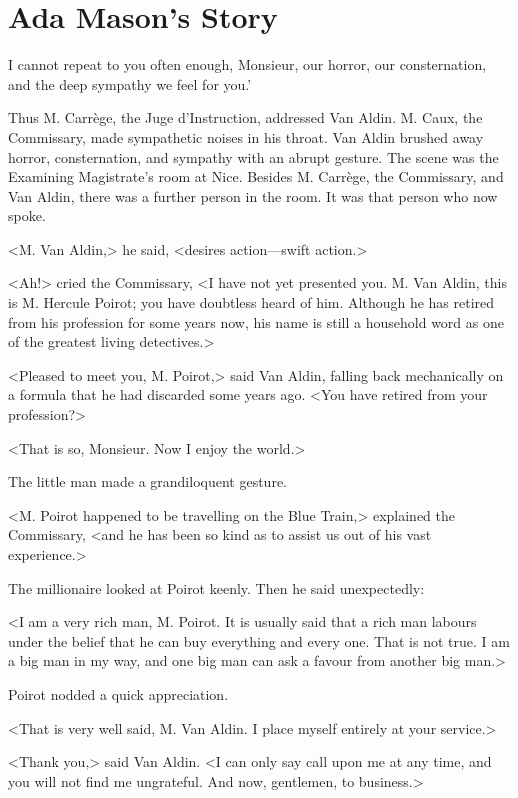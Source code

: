 \chapter{Ada Mason's Story}


\lettrine[ante=`]{I}{} cannot repeat to you often enough, Monsieur, our horror, our consternation, and the deep sympathy we feel for you.'

\zz
Thus M. Carrège, the Juge d'Instruction, addressed Van Aldin. M. Caux, the Commissary, made sympathetic noises in his throat. Van Aldin brushed away horror, consternation, and sympathy with an abrupt gesture. The scene was the Examining Magistrate's room at Nice. Besides M. Carrège, the Commissary, and Van Aldin, there was a further person in the room. It was that person who now spoke.

<M. Van Aldin,> he said, <desires action—swift action.>

<Ah!> cried the Commissary, <I have not yet presented you. M. Van Aldin, this is M. Hercule Poirot; you have doubtless heard of him. Although he has retired from his profession for some years now, his name is still a household word as one of the greatest living detectives.>

<Pleased to meet you, M. Poirot,> said Van Aldin, falling back mechanically on a formula that he had discarded some years ago. <You have retired from your profession?>

<That is so, Monsieur. Now I enjoy the world.>

The little man made a grandiloquent gesture.

<M. Poirot happened to be travelling on the Blue Train,> explained the Commissary, <and he has been so kind as to assist us out of his vast experience.>

The millionaire looked at Poirot keenly. Then he said unexpectedly:

<I am a very rich man, M. Poirot. It is usually said that a rich man labours under the belief that he can buy everything and every one. That is not true. I am a big man in my way, and one big man can ask a favour from another big man.>

Poirot nodded a quick appreciation.

<That is very well said, M. Van Aldin. I place myself entirely at your service.>

<Thank you,> said Van Aldin. <I can only say call upon me at any time, and you will not find me ungrateful. And now, gentlemen, to business.>

